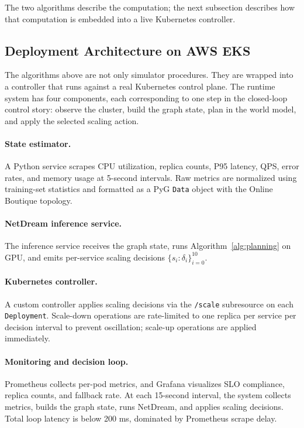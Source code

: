 The two algorithms describe the computation; the next subsection
describes how that computation is embedded into a live Kubernetes
controller.

\subsection{Deployment Architecture on AWS EKS}
\label{app:deployment}

The algorithms above are not only simulator procedures.  They are wrapped
into a controller that runs against a real Kubernetes control plane.  The
runtime system has four components, each corresponding to one step in the
closed-loop control story: observe the cluster, build the graph state,
plan in the world model, and apply the selected scaling action.

\paragraph{State estimator.}
A Python service scrapes CPU utilization, replica counts, P95 latency,
QPS, error rates, and memory usage at 5-second intervals.  Raw metrics
are normalized using training-set statistics and formatted as a PyG
\texttt{Data} object with the Online Boutique topology.

\paragraph{NetDream inference service.}
The inference service receives the graph state, runs
Algorithm~\ref{alg:planning} on GPU, and emits per-service scaling
decisions $\{s_i:\delta_i\}_{i=0}^{10}$.

\paragraph{Kubernetes controller.}
A custom controller applies scaling decisions via the \texttt{/scale}
subresource on each \texttt{Deployment}.  Scale-down operations are
rate-limited to one replica per service per decision interval to prevent
oscillation; scale-up operations are applied immediately.

\paragraph{Monitoring and decision loop.}
Prometheus collects per-pod metrics, and Grafana visualizes SLO
compliance, replica counts, and fallback rate.  At each 15-second
interval, the system collects metrics, builds the graph state, runs
NetDream, and applies scaling decisions.  Total loop latency is below
200 ms, dominated by Prometheus scrape delay.


